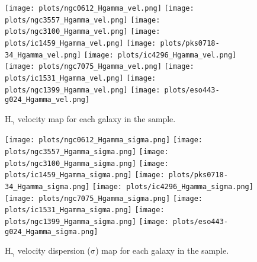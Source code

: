 \documentclass[fleqn,usenatbib,useAMS]{mnras}
\begin{document}
        \begin{figure*}
            \centering
            \texttt{[image: plots/ngc0612\_Hgamma\_vel.png]}
            \texttt{[image: plots/ngc3557\_Hgamma\_vel.png]}
            \texttt{[image: plots/ngc3100\_Hgamma\_vel.png]}
            \texttt{[image: plots/ic1459\_Hgamma\_vel.png]}
            \texttt{[image: plots/pks0718-34\_Hgamma\_vel.png]}
            \texttt{[image: plots/ic4296\_Hgamma\_vel.png]}
            \texttt{[image: plots/ngc7075\_Hgamma\_vel.png]}
            \texttt{[image: plots/ic1531\_Hgamma\_vel.png]}
            \texttt{[image: plots/ngc1399\_Hgamma\_vel.png]}
            \texttt{[image: plots/eso443-g024\_Hgamma\_vel.png]}
            \caption{H$_\mathrm{\gamma}$ velocity map for each galaxy in the sample.}
            \label{fig:Hgamma_vel}
        \end{figure*}


        \begin{figure*}
            \centering
            \texttt{[image: plots/ngc0612\_Hgamma\_sigma.png]}
            \texttt{[image: plots/ngc3557\_Hgamma\_sigma.png]}
            \texttt{[image: plots/ngc3100\_Hgamma\_sigma.png]}
            \texttt{[image: plots/ic1459\_Hgamma\_sigma.png]}
            \texttt{[image: plots/pks0718-34\_Hgamma\_sigma.png]}
            \texttt{[image: plots/ic4296\_Hgamma\_sigma.png]}
            \texttt{[image: plots/ngc7075\_Hgamma\_sigma.png]}
            \texttt{[image: plots/ic1531\_Hgamma\_sigma.png]}
            \texttt{[image: plots/ngc1399\_Hgamma\_sigma.png]}
            \texttt{[image: plots/eso443-g024\_Hgamma\_sigma.png]}
            \caption{H$_\mathrm{\gamma}$ velocity dispersion ($\mathrm{\sigma}$) map for each galaxy in the sample.}
            \label{fig:Hgamma_sigma}
        \end{figure*}
\end{document}
